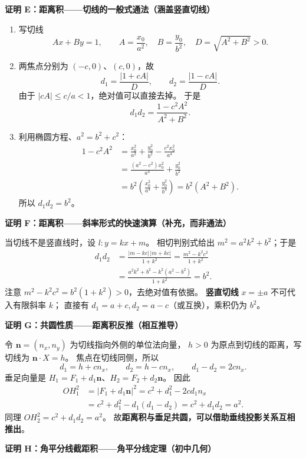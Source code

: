\begin{proofbox}
\medskip
\textbf{证明 E：距离积——切线的一般式通法（涵盖竖直切线）}
\begin{enumerate}
\item 写切线
\[
Ax+By=1,\qquad A=\frac{x_0}{a^2},\quad B=\frac{y_0}{b^2},
\quad D=\sqrt{A^2+B^2}>0.
\]
\item 两焦点分别为 $(-c,0)$、$(c,0)$，故
\[
d_1=\frac{|1+cA|}{D},\qquad d_2=\frac{|1-cA|}{D}.
\]
由于 $|cA|\le c/a<1$，绝对值可以直接去掉。
于是
\[
d_1d_2=\frac{1-c^2A^2}{A^2+B^2}.
\]
\item 利用椭圆方程、$a^2=b^2+c^2$：
\[
\begin{aligned}
1-c^2A^2
&=\frac{x_0^2}{a^2}+\frac{y_0^2}{b^2}-\frac{c^2x_0^2}{a^4}\\
&=\frac{(a^2-c^2)x_0^2}{a^4}+\frac{y_0^2}{b^2}\\
&=b^2\left(\frac{x_0^2}{a^4}+\frac{y_0^2}{b^4}\right)
=b^2(A^2+B^2).
\end{aligned}
\]
所以 $d_1d_2=b^2$。
\end{enumerate}

\textbf{证明 F：距离积——斜率形式的快速演算（补充，而非通法）}

当切线不是竖直线时，设 $l:y=kx+m$。
相切判别式给出 $m^2=a^2k^2+b^2$；于是
\[
\begin{aligned}
d_1d_2
&=\frac{|m-kc|\,|m+kc|}{1+k^2}
=\frac{m^2-k^2c^2}{1+k^2}\\
&=\frac{a^2k^2+b^2-k^2(a^2-b^2)}{1+k^2}=b^2.
\end{aligned}
\]
注意 $m^2-k^2c^2=b^2(1+k^2)>0$，去绝对值有依据。
\textbf{竖直切线} $x=\pm a$ 不可代入有限斜率 $k$；
直接有 $d_1=a+c,d_2=a-c$（或互换），乘积仍为 $b^2$。

\medskip
\textbf{证明 G：共圆性质——距离积反推（相互推导）}

令 $\boldsymbol n=(n_x,n_y)$ 为切线指向外侧的单位法向量，
$h>0$ 为原点到切线的距离，写切线为
$\boldsymbol n\cdot X=h$。
焦点在切线同侧，所以
\[
d_1=h+cn_x,\qquad d_2=h-cn_x,
\qquad d_1-d_2=2cn_x.
\]
垂足向量是
$H_1=F_1+d_1\boldsymbol n$、$H_2=F_2+d_2\boldsymbol n$。
因此
\[
\begin{aligned}
OH_1^2
&=|F_1+d_1\boldsymbol n|^2
=c^2+d_1^2-2cd_1n_x\\
&=c^2+d_1^2-d_1(d_1-d_2)
=c^2+d_1d_2=a^2.
\end{aligned}
\]
同理 $OH_2^2=c^2+d_1d_2=a^2$。
故\textbf{距离积与垂足共圆，可以借助垂线投影关系互相推出}。

\medskip
\textbf{证明 H：角平分线截距积——角平分线定理（初中几何）}


\end{proofbox}
